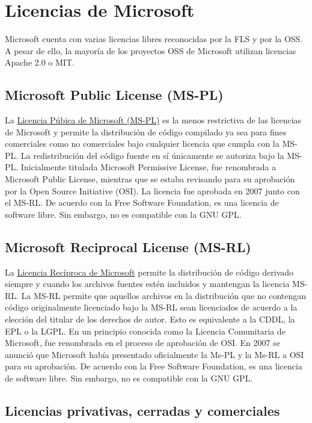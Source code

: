 \section{Licencias de Microsoft}
Microsoft cuenta con varias licencias libres reconocidas por la FLS y por la OSS. A pesar de ello, la mayoría de los proyectos OSS de Microsoft utilizan licencias Apache 2.0 o MIT.

\subsection{Microsoft Public License (MS-PL)}
La \href{https://opensource.org/licenses/MS-PL}{Licencia Púbica de Microsoft (MS-PL)} es la menos restrictiva de las licencias de Microsoft y permite la distribución de código compilado ya sea para fines comerciales como no comerciales bajo cualquier licencia que cumpla con la MS-PL. La redistribución del código fuente en sí únicamente se autoriza bajo la MS-PL. Inicialmente titulada Microsoft Permissive License, fue renombrada a Microsoft Public License, mientras que se estaba revisando para su aprobación por la Open Source Initiative (OSI). La licencia fue aprobada en 2007 junto con el MS-RL. De acuerdo con la Free Software Foundation, es una licencia de software libre. Sin embargo, no es compatible con la GNU GPL.\cite{wiki_2019:microsoft_public_license_mspl}

\subsection{Microsoft Reciprocal License (MS-RL)}
La \href{https://opensource.org/licenses/MS-RL}{Licencia Recíproca de Microsoft} permite la distribución de código derivado siempre y cuando los archivos fuentes estén incluidos y mantengan la licencia MS-RL. La MS-RL permite que aquellos archivos en la distribución que no contengan código originalmente licenciado bajo la MS-RL sean licenciados de acuerdo a la elección del titular de los derechos de autor. Esto es equivalente a la CDDL, la EPL o la LGPL. En un principio conocida como la Licencia Comunitaria de Microsoft, fue renombrada en el proceso de aprobación de OSI. En 2007 se anunció que Microsoft había presentado oficialmente la Ms-PL y la Ms-RL a OSI para su aprobación.  De acuerdo con la Free Software Foundation, es una licencia de software libre. Sin embargo, no es compatible con la GNU GPL.\cite{wiki_2019:microsoft_reciprocal_license_msrl}

\subsection{Licencias privativas, cerradas y comerciales}
